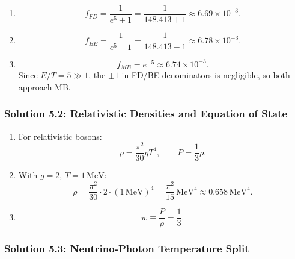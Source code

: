 \begin{enumerate}[label=(\alph*)]
  \item
  \[
    f_{FD}=\frac{1}{e^5+1}=\frac{1}{148.413+1}\approx 6.69\times 10^{-3}.
  \]

  \item
  \[
    f_{BE}=\frac{1}{e^5-1}=\frac{1}{148.413-1}\approx 6.78\times 10^{-3}.
  \]

  \item
  \[
    f_{MB}=e^{-5}\approx 6.74\times 10^{-3}.
  \]
  Since $E/T=5\gg1$, the $\pm1$ in FD/BE denominators is negligible, so both approach MB.
\end{enumerate}

\subsubsection*{Solution 5.2: Relativistic Densities and Equation of State}

\begin{enumerate}[label=(\alph*)]
  \item For relativistic bosons:
  \[
    \rho = \frac{\pi^2}{30}gT^4,
    \qquad
    P = \frac{1}{3}\rho.
  \]

  \item With $g=2$, $T=1\,\mathrm{MeV}$:
  \[
    \rho = \frac{\pi^2}{30}\cdot 2\cdot (1\,\mathrm{MeV})^4
    = \frac{\pi^2}{15}\,\mathrm{MeV}^4
    \approx 0.658\,\mathrm{MeV}^4.
  \]

  \item
  \[
    w\equiv\frac{P}{\rho}=\frac{1}{3}.
  \]
\end{enumerate}

\subsubsection*{Solution 5.3: Neutrino-Photon Temperature Split}

